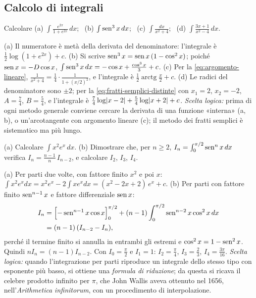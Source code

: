 \subsection*{Calcolo di integrali}

\begin{esercizio}
Calcolare (a) $\int\frac{e^{2x}}{1+e^{2x}}\,dx$; \ (b) $\int\operatorname{sen}^{3}x\,dx$; \ (c) $\int\frac{dx}{x^{2}+4}$; \
(d) $\int\frac{3x+1}{x^{2}-4}\,dx$.
\begin{soluzione}
(a) Il numeratore è metà della derivata del denominatore: l'integrale è
$\frac12\log(1+e^{2x})+c$. (b) Si scrive $\operatorname{sen}^{3}x=\operatorname{sen} x\,(1-\cos^{2}x)$; poiché $\operatorname{sen} x=-D\cos x$,
$\int\operatorname{sen}^{3}x\,dx=-\cos x+\frac{\cos^{3}x}3+c$. (c) Per la \eqref{eq:argomento-lineare},
$\frac1{x^{2}+4}=\frac14\cdot\frac1{1+(x/2)^{2}}$, e l'integrale è $\frac12\operatorname{arctg}\frac x2+c$. (d) Le radici
del denominatore sono $\pm2$; per la \eqref{eq:fratti-semplici-distinte} con $x_{1}=2$,
$x_{2}=-2$, $A=\frac74$, $B=\frac54$, e l'integrale è $\frac74\log\lvert x-2\rvert+\frac54\log\lvert x+2\rvert+c$.
\emph{Scelta logica:} prima di ogni metodo generale conviene cercare la derivata di una
funzione «interna» (a, b), o un'arcotangente con argomento lineare (c); il metodo dei
fratti semplici è sistematico ma più lungo.
\end{soluzione}
\end{esercizio}

\begin{esercizio}\label{es:wallis}
(a) Calcolare $\int x^{2}e^{x}\,dx$. (b) Dimostrare che, per $n\ge2$,
$I_{n}=\int_{0}^{\pi/2}\operatorname{sen}^{n}x\,dx$ verifica $I_{n}=\frac{n-1}n\,I_{n-2}$, e calcolare $I_{2}$, $I_{3}$, $I_{4}$.
\begin{soluzione}
(a) Per parti due volte, con fattore finito $x^{2}$ e poi $x$:
$\int x^{2}e^{x}dx=x^{2}e^{x}-2\int xe^{x}dx=(x^{2}-2x+2)\,e^{x}+c$. (b) Per parti con fattore finito
$\operatorname{sen}^{n-1}x$ e fattore differenziale $\operatorname{sen} x$:
\[
\begin{aligned}
  I_{n}&=\Bigl[-\operatorname{sen}^{n-1}x\cos x\Bigr]_{0}^{\pi/2}
  +(n-1)\int_{0}^{\pi/2}\operatorname{sen}^{n-2}x\cos^{2}x\,dx\\
  &=(n-1)\,(I_{n-2}-I_{n}) ,
\end{aligned}
\]
perché il termine finito si annulla in entrambi gli estremi e $\cos^{2}x=1-\operatorname{sen}^{2}x$. Quindi
$nI_{n}=(n-1)I_{n-2}$. Con $I_{0}=\frac\pi2$ e $I_{1}=1$: $I_{2}=\frac\pi4$, $I_{3}=\frac23$, $I_{4}=\frac{3\pi}{16}$.
\emph{Scelta logica:} quando l'integrazione per parti riproduce un integrale dello
stesso tipo con esponente più basso, si ottiene una \emph{formula di riduzione}; da
questa si ricava il celebre prodotto infinito per $\pi$, che John Wallis aveva ottenuto
nel 1656, nell'\emph{Arithmetica infinitorum}, con un procedimento di interpolazione.
\end{soluzione}
\end{esercizio}

